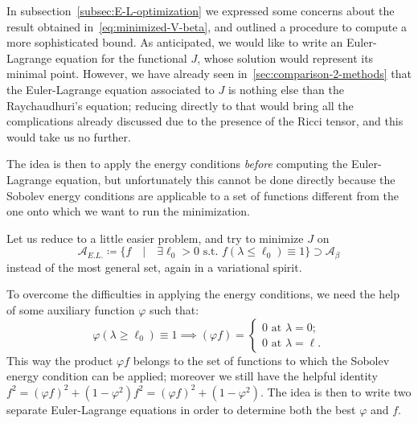 In subsection~\ref{subsec:E-L-optimization} we expressed some concerns about the result obtained in~\eqref{eq:minimized-V-beta}, and outlined a procedure to compute a more sophisticated bound.
As anticipated, we would like to write an Euler-Lagrange equation for the functional \(J\), whose solution would represent its minimal point.
However, we have already seen in~\ref{sec:comparison-2-methods} that the Euler-Lagrange equation associated to \(J\) is nothing else than the Raychaudhuri's equation; reducing directly to that would bring all the complications already discussed due to the presence of the Ricci tensor, and this would take us no further.

The idea is then to apply the energy conditions \emph{before} computing the Euler-Lagrange equation, but unfortunately this cannot be done directly because the Sobolev energy conditions are applicable to a set of functions different from the one onto which we want to run the minimization.

Let us reduce to a little easier problem, and try to minimize \(J\) on
\[
\mathcal{A}_{E.L.} \coloneqq \{f \quad \vert \quad \exists \ell_0 > 0 \text{ s.t. } f(\lambda \le \ell_0) \equiv 1\} \supset \mathcal{A}_{\beta}
\]
instead of the most general set, again in a variational spirit.

To overcome the difficulties in applying the energy conditions, we need the help of some auxiliary function \(\varphi\) such that:
\[
\varphi(\lambda \ge \ell_0) \equiv 1 \implies \left(\varphi f\right)   =
\begin{cases}
    0 \text{ at } \lambda = 0;\\
    0 \text{ at } \lambda = \ell.
\end{cases}
\]
This way the product \(\varphi f\) belongs to the set of functions to which the Sobolev energy condition can be applied; moreover we still have the helpful identity \(f^2 = \left(\varphi f\right)^2 + \left(1 - \varphi^2\right) f^2 = \left(\varphi f\right)^2 + \left(1 - \varphi^2\right)\). The idea is then to write two separate Euler-Lagrange equations in order to determine both the best \(\varphi\) and \(f\). 

